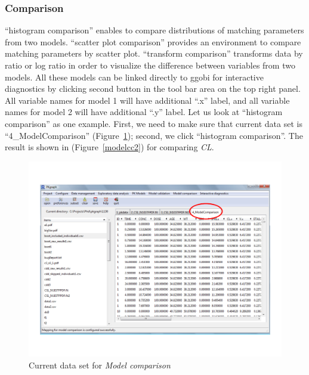 \documentclass[a4paper]{article}
\begin{document}
\subsubsection{Comparison}
``histogram comparison'' enables to compare distributions of matching parameters from two models. ``scatter plot comparison''  provides an environment to compare matching parameters by scatter plot. ``transform comparison''  transforms data by ratio or log ratio in order to visualize the difference between variables from two models. All these models can be linked directly to ggobi for interactive diagnostics by clicking second button in the tool bar area on the top right panel.
\newline
\newline
All variable names for model 1 will have additional ``.x'' label, and all variable names for model 2 will have additional ``.y'' label.
\newline
\newline
Let us look at ``histogram comparison'' as one example. First, we need to make sure that current data set is ``4\_ModelComparison'' (Figure~\ref{modelcc1}); second, we click ``histogram comparison''. The result is shown in (Figure~\ref{modelcc2}) for comparing \textit{CL}.\begin{figure}[h!tb] \centering
\includegraphics[scale=0.6]{modelcc1.pdf}
\caption{Current data set for \textit{Model comparison}}
\label{modelcc1}
\end{figure}
\end{document}
